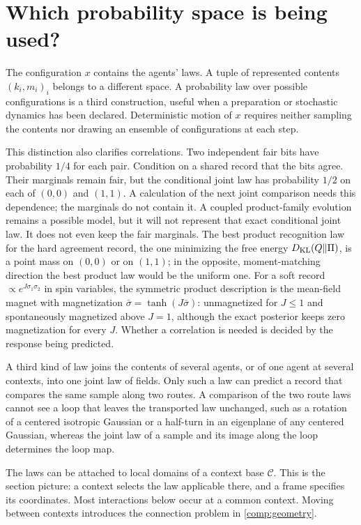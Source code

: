 \section{Which probability space is being used?}

The configuration $x$ contains the agents' laws. A tuple of represented contents $(k_i,m_i)_i$ belongs to a different space. A probability law over possible configurations is a third construction, useful when a preparation or stochastic dynamics has been declared. Deterministic motion of $x$ requires neither sampling the contents nor drawing an ensemble of configurations at each step.

This distinction also clarifies correlations. Two independent fair bits have probability $1/4$ for each pair. Condition on a shared record that the bits agree. Their marginals remain fair, but the conditional joint law has probability $1/2$ on each of $(0,0)$ and $(1,1)$. A calculation of the next joint comparison needs this dependence; the marginals do not contain it. A coupled product-family evolution remains a possible model, but it will not represent that exact conditional joint law. It does not even keep the fair marginals. The best product recognition law for the hard agreement record, the one minimizing the free energy $D_{\mathrm{KL}}(Q\Vert\Pi)$, is a point mass on $(0,0)$ or on $(1,1)$; in the opposite, moment-matching direction the best product law would be the uniform one. For a soft record $\propto e^{J\sigma_1\sigma_2}$ in spin variables, the symmetric product description is the mean-field magnet with magnetization $\bar\sigma=\tanh(J\bar\sigma)$: unmagnetized for $J\leq1$ and spontaneously magnetized above $J=1$, although the exact posterior keeps zero magnetization for every $J$. Whether a correlation is needed is decided by the response being predicted.

A third kind of law joins the contents of several agents, or of one agent at several contexts, into one joint law of fields. Only such a law can predict a record that compares the same sample along two routes. A comparison of the two route laws cannot see a loop that leaves the transported law unchanged, such as a rotation of a centered isotropic Gaussian or a half-turn in an eigenplane of any centered Gaussian, whereas the joint law of a sample and its image along the loop determines the loop map.

The laws can be attached to local domains of a context base $\mathcal C$. This is the section picture: a context selects the law applicable there, and a frame specifies its coordinates. Most interactions below occur at a common context. Moving between contexts introduces the connection problem in \cref{comp:geometry}.
